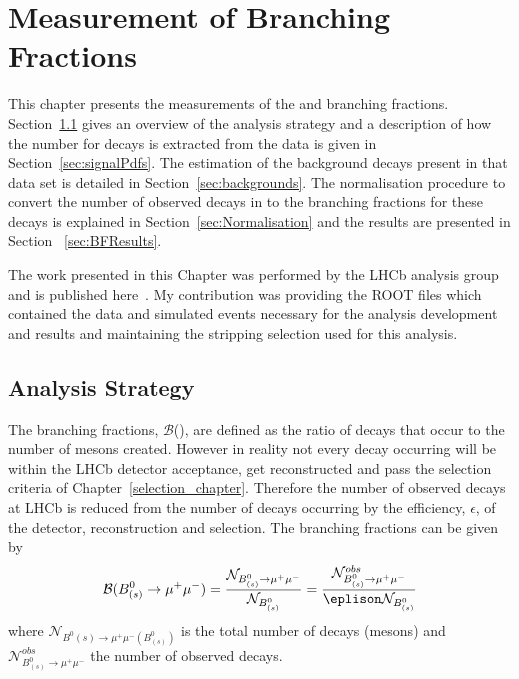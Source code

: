 \chapter{Measurement of \bmumu Branching Fractions}
\label{sec:BFanalysis}
This chapter presents the measurements of the \bdmumu and \bsmumu branching fractions. Section~\ref{sec:BFAnalysisStrategy} gives an overview of the analysis strategy and a description of how the number for \bmumu decays is extracted from the data is given in Section~\ref{sec:signalPdfs}. The estimation of the background decays present in that data set is detailed in Section~\ref{sec:backgrounds}. The normalisation procedure to convert the number of observed \bmumu decays in to the branching fractions for these decays is explained in Section~\ref{sec:Normalisation} and the results are presented in Section ~\ref{sec:BFResults}. 

The work presented in this Chapter was performed by the \bmumu LHCb analysis group and is published here~\cite{}. My contribution was providing the ROOT files which contained the data and simulated events necessary for the analysis development and results and maintaining the stripping selection used for this analysis.

\section{Analysis Strategy} 
\label{sec:BFAnalysisStrategy}
The \bmumu branching fractions, $\mathcal{B}$(\bmumu), are defined as the ratio of \bmumu decays that occur to the number of \bsd mesons created. However in reality not every \bmumu decay occurring will be within the LHCb detector acceptance, get reconstructed and pass the selection criteria of Chapter~\ref{selection_chapter}. Therefore the number of observed \bmumu decays at LHCb is reduced from the number of \bmumu decays occurring by the efficiency, $\epsilon$, of the detector, reconstruction and selection.
The \bmumu branching fractions can be given by
\begin{equation}
\mathcal{B}(B^{0}_{(s)} \to \mu^{+} \mu^{-}) = \frac{\mathcal{N}_{B^{0}_{(s)} \to \mu^{+} \mu^{-}}}{\mathcal{N}_{B^{0}_{(s)}}} = \frac{\mathcal{N}^{obs}_{B^{0}_{(s)} \to \mu^{+} \mu^{-}}}{\eplison \mathcal{N}_{B^{0}_{(s)}}}
\label{eq:BFdef}
\end{equation}
where $\mathcal{N}_{B^{0}{(s)} \to \mu^{+} \mu^{-}(B^{0}_{(s)})}$ is the total number of \bmumu decays (\bsd mesons) and $\mathcal{N}^{obs}_{B^{0}_{(s)} \to \mu^{+} \mu^{-}}$ the number of observed \bmumu decays.


